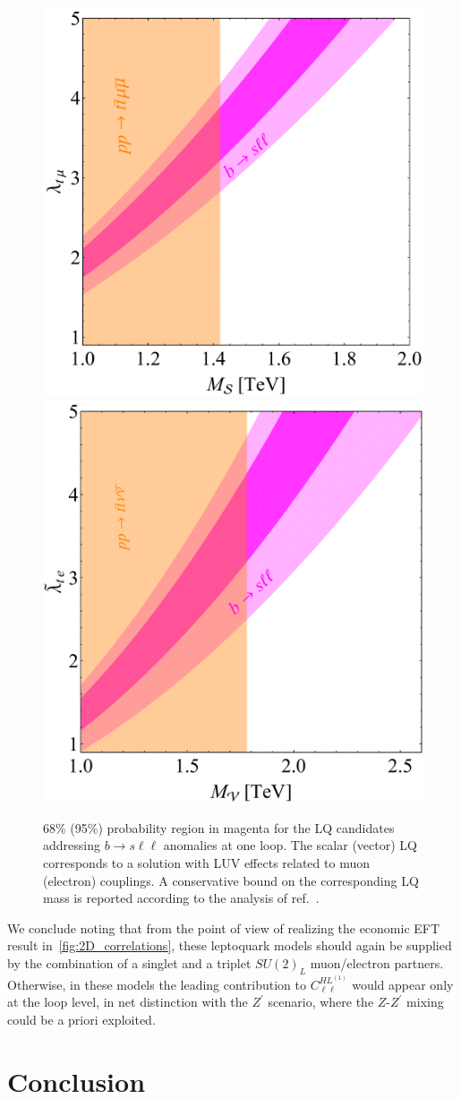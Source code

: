 \begin{figure}[htpb!]
	\centering 
	\includegraphics[width=0.45\linewidth]{figures/Scalar_LQ.pdf}
	\includegraphics[width=0.435\linewidth]{figures/Vector_LQ.pdf}
	\caption{68\% (95\%) probability region in magenta for the LQ candidates addressing $b \to s \ell \ell$ anomalies at one loop. The scalar (vector) LQ corresponds to a solution with LUV effects related to muon (electron) couplings. A conservative bound on the corresponding LQ mass is reported according to the analysis of ref.~\cite{Angelescu:2018tyl}.}    
	\label{fig:LQ_constraints}
\end{figure}

We conclude noting that from the point of view of realizing the economic EFT result in~\autoref{fig:2D_correlations}, these leptoquark models should again be supplied by the combination of a singlet and a triplet $SU(2)_{L}$ muon/electron partners. Otherwise, in these models the leading contribution to $C^{HL^{(1)}}_{\ell\ell}$ would appear only at the loop level, in net distinction with the $Z^{\prime}$ scenario, where the $Z$-$Z^{\prime}$ mixing could be a priori exploited.

\section{Conclusion}
\label{sec:sum}

